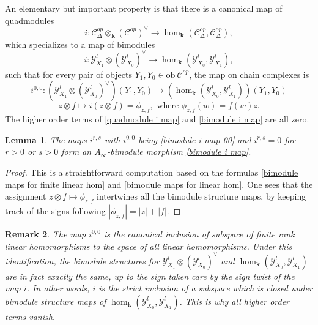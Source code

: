 \documentclass[11pt]{amsproc}
\def\K{{\mathbf{k}}}
\def\Y{\mathcal{Y}}
\def\cc{\mathcal{C}}
\def\D{\Delta}
\def\ainf{A_\infty}
\def\ob{\mathrm{ob\ }}
\newtheorem{lem}{Lemma}[section]
\newtheorem{rem}[lem]{Remark}
\theoremstyle{remark}
\numberwithin{equation}{section}
\begin{document}
 An elementary but important property is that there is a canonical map of quadmodules
\begin{equation}\label{quadmodule i map}
i: \cc^{op}_{\D} \otimes_{\K} (\cc^{op})^{\vee} \to \hom_{\K}(\cc^{op}_{\D}, \cc^{op}_{\D}),
\end{equation}
which specializes to a map of bimodules
\begin{equation}\label{bimodule i map}
i:  \Y^{l}_{X_{1}} \otimes(\Y^{l}_{X_{0}})^{\vee} \to \hom_{\K}(\Y^{l}_{X_{0}}, \Y^{l}_{X_{1}}),
\end{equation}
such that for every pair of objects $Y_{1}, Y_{0} \in \ob \cc^{op}$, the map on chain complexes is
\begin{equation}\label{bimodule i map 00}
i^{0, 0}: (\Y^{l}_{X_{1}} \otimes (\Y^{l}_{X_{0}})^{\vee})(Y_{1}, Y_{0}) \to (\hom_{\K}(\Y^{l}_{X_{0}}, \Y^{l}_{X_{1}}))(Y_{1}, Y_{0})
\end{equation}
\begin{equation}\label{sign for i map}
z \otimes f \mapsto i(z \otimes f) = \phi_{z, f}, \text{ where } \phi_{z, f}(w) = f(w) z.
\end{equation}
The higher order terms of \eqref{quadmodule i map} and \eqref{bimodule i map} are all zero.

\begin{lem}\label{lem: bimodule i map}
The maps $i^{r, s}$ with $i^{0, 0}$ being \eqref{bimodule i map 00} and $i^{r, s} = 0$ for $r>0$ or $s>0$ form an $\ainf$-bimodule morphism \eqref{bimodule i map}.
\end{lem}
\begin{proof}
This is a straightforward computation based on the formulas \eqref{bimodule maps for finite linear hom} and \eqref{bimodule maps for linear hom}. 
One sees that the assignment $z \otimes f \mapsto \phi_{z, f}$ intertwines all the bimodule structure maps,
by keeping track of the signs following $|\phi_{z, f}| = |z| + |f|$.
\end{proof}

\begin{rem}
The map $i^{0, 0}$ is the canonical inclusion of subspace of finite rank linear homomorphisms to the space of all linear homomorphisms. 
Under this identification, the bimodule structures for $\Y^{l}_{X_{1}} \otimes(\Y^{l}_{X_{0}})^{\vee}$ and $\hom_{\K}(\Y^{l}_{X_{0}}, \Y^{l}_{X_{1}})$ are in fact exactly the same, 
up to the sign taken care by the sign twist of the map $i$.
In other words, $i$ is the strict inclusion of a subspace which is closed under bimodule structure maps of $\hom_{\K}(\Y^{l}_{X_{0}}, \Y^{l}_{X_{1}})$.
This is why all higher order terms vanish.
\end{rem}
\end{document}
